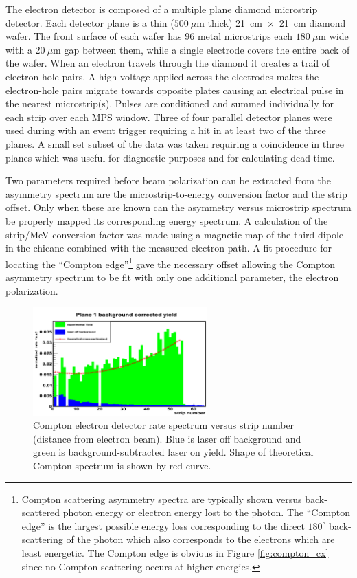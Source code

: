 The electron detector is composed of a multiple plane diamond microstrip detector. Each detector plane is a thin ($500~\mu$m thick) 21~cm~$\times$~21~cm diamond wafer. The front surface of each wafer has 96 metal microstrips each $180~\mu$m wide with a $20~\mu$m gap between them, while a single electrode covers the entire back of the wafer. When an electron travels through the diamond it creates a trail of electron-hole pairs. A high voltage applied across the electrodes makes the electron-hole pairs migrate towards opposite plates causing an electrical pulse in the nearest microstrip(s). Pulses are conditioned and summed individually for each strip over each MPS window. Three of four parallel detector planes were used during \Qs with an event trigger requiring a hit in at least two of the three planes. A small set subset of the data was taken requiring a coincidence in three planes which was useful for diagnostic purposes and for calculating dead time.

Two parameters required before beam polarization can be extracted from the asymmetry spectrum are the microstrip-to-energy conversion factor and the strip offset. Only when these are known can the asymmetry versus microstrip spectrum be properly mapped its corresponding energy spectrum. A calculation of the strip/MeV conversion factor was made using a magnetic map of the third dipole in the chicane combined with the measured electron path. A fit procedure for locating the ``Compton edge''\footnote{Compton scattering asymmetry spectra are typically shown versus back-scattered photon energy or electron energy lost to the photon. The ``Compton edge'' is the largest possible energy loss corresponding to the direct $180^{\circ}$ back-scattering of the photon which also corresponds to the electrons which are least energetic. The Compton edge is obvious in Figure \ref{fig:compton_cx} since no Compton scattering occurs at higher energies.} gave the necessary offset allowing the Compton asymmetry spectrum to be fit with only one additional parameter, the electron polarization.
\begin{figure}[ht]
\centering
\includegraphics[width=0.6\textwidth]{Pictures/edet_spectrum.png}
\caption{Compton electron detector rate spectrum versus strip number (distance from electron beam). Blue is laser off background and green is background-subtracted laser on yield. Shape of theoretical Compton spectrum is shown by red curve.}
\label{fig:edet_spectrum}
\end{figure} 

